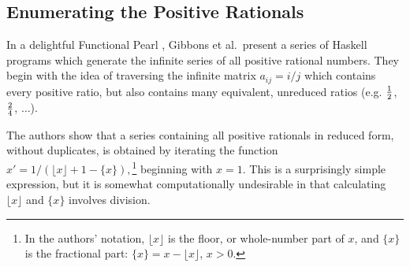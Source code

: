\subsection{Enumerating the Positive Rationals}
In a delightful Functional Pearl \cite{gibbons}, Gibbons et al.\ present a series of Haskell programs which generate the infinite series of all positive rational numbers. They begin with the idea of traversing the infinite matrix $a_{ij} = i/j$ which contains every positive ratio, but also contains many equivalent, unreduced ratios (e.g. $\nicefrac{1}{2}$, $\nicefrac{2}{4}$, $\dots$).

The authors show that a series containing all positive rationals in reduced form, without duplicates, is obtained by iterating the function 
$x' = 1/{(\lfloor x \rfloor + 1 - \{x\})},$\footnote{In the authors' notation, $\lfloor x \rfloor$ is the floor, or whole-number part of $x$, and $\{x\}$ is the fractional part: $\{x\} = x - \lfloor x \rfloor$, $x > 0$.} beginning with $x=1$. This is a surprisingly simple expression, but it is somewhat computationally undesirable in that calculating $\lfloor x \rfloor$ and $\{x\}$ involves division.

